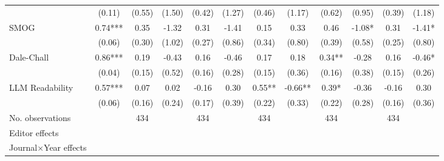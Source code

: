 \begin{table}
\begin{threeparttable}
\begin{tabular}{p{3cm}S@{}S@{}S@{}S@{}S@{}S@{}S@{}S@{}S@{}S@{}S@{}}
                                          &      (0.11)   &      (0.55)   &      (1.50)   &      (0.42)   &      (1.27)   &      (0.46)   &      (1.17)   &      (0.62)   &      (0.95)   &      (0.39)   &      (1.18)   \\
            SMOG                          &        0.74***&        0.35   &       -1.32   &        0.31   &       -1.41   &        0.15   &        0.33   &        0.46   &       -1.08*  &        0.31   &       -1.41*  \\
                                          &      (0.06)   &      (0.30)   &      (1.02)   &      (0.27)   &      (0.86)   &      (0.34)   &      (0.80)   &      (0.39)   &      (0.58)   &      (0.25)   &      (0.80)   \\
            Dale-Chall                    &        0.86***&        0.19   &       -0.43   &        0.16   &       -0.46   &        0.17   &        0.18   &        0.34** &       -0.28   &        0.16   &       -0.46*  \\
                                          &      (0.04)   &      (0.15)   &      (0.52)   &      (0.16)   &      (0.28)   &      (0.15)   &      (0.36)   &      (0.16)   &      (0.38)   &      (0.15)   &      (0.26)   \\
            LLM Readability        &        0.57***&        0.07   &        0.02   &       -0.16   &        0.30   &        0.55** &       -0.66** &        0.39*  &       -0.36   &       -0.16   &        0.30   \\
                                          &      (0.06)   &      (0.16)   &      (0.24)   &      (0.17)   &      (0.39)   &      (0.22)   &      (0.33)   &      (0.22)   &      (0.28)   &      (0.16)   &      (0.36)   \\
            \midrule
            No. observations              &               &         434   &               &         434   &               &         434   &               &         434   &               &         434   &               \\
            \midrule
            Editor effects        &               &           {}   &               &           {}   &               &           {}   &               &           {}   &               &               &               \\
            Journal\(\times\)Year effects          &               &           {}   &               &           {}   &               &           {}   &               &           {}   &               &               &               \\

\end{tabular}
\end{threeparttable}
\end{table}
